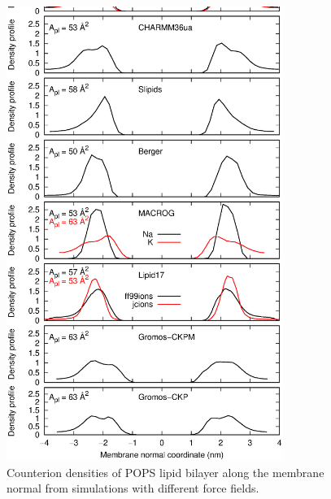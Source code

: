 \documentclass[aps,prl,superscriptaddress,twocolumn]{revtex4}
\begin{document}
\begin{figure}[!htb]
  \centering
  \includegraphics[width=9.0cm]{../Figs/NAdensPOPS.eps}
  \caption{\label{NAdensPOPS}
    Counterion densities of POPS lipid bilayer along the membrane normal from
    simulations with different force fields.
  }
\end{figure}
\end{document}
